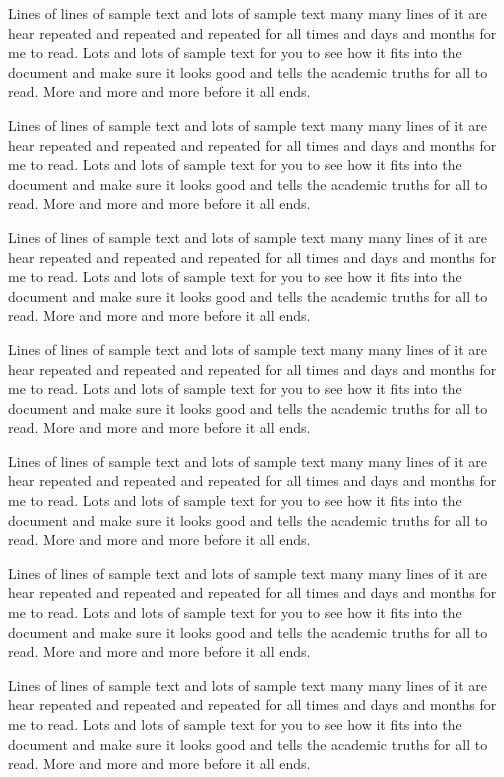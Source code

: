 Lines of lines of sample text and lots of sample text many many lines
of it are hear repeated and repeated and repeated for all times and days
and months for me to read.  Lots and lots of sample text for you to
see how it fits into the document and make sure it looks good and
tells the academic truths for all to read.  More and more and more
before it all ends.  

Lines of lines of sample text and lots of sample text many many lines
of it are hear repeated and repeated and repeated for all times and days
and months for me to read.  Lots and lots of sample text for you to
see how it fits into the document and make sure it looks good and
tells the academic truths for all to read.  More and more and more
before it all ends.  

Lines of lines of sample text and lots of sample text many many lines
of it are hear repeated and repeated and repeated for all times and days
and months for me to read.  Lots and lots of sample text for you to
see how it fits into the document and make sure it looks good and
tells the academic truths for all to read.  More and more and more
before it all ends.  

Lines of lines of sample text and lots of sample text many many lines
of it are hear repeated and repeated and repeated for all times and days
and months for me to read.  Lots and lots of sample text for you to
see how it fits into the document and make sure it looks good and
tells the academic truths for all to read.  More and more and more
before it all ends.  

Lines of lines of sample text and lots of sample text many many lines
of it are hear repeated and repeated and repeated for all times and days
and months for me to read.  Lots and lots of sample text for you to
see how it fits into the document and make sure it looks good and
tells the academic truths for all to read.  More and more and more
before it all ends.  

Lines of lines of sample text and lots of sample text many many lines
of it are hear repeated and repeated and repeated for all times and days
and months for me to read.  Lots and lots of sample text for you to
see how it fits into the document and make sure it looks good and
tells the academic truths for all to read.  More and more and more
before it all ends.  

Lines of lines of sample text and lots of sample text many many lines
of it are hear repeated and repeated and repeated for all times and days
and months for me to read.  Lots and lots of sample text for you to
see how it fits into the document and make sure it looks good and
tells the academic truths for all to read.  More and more and more
before it all ends.  

